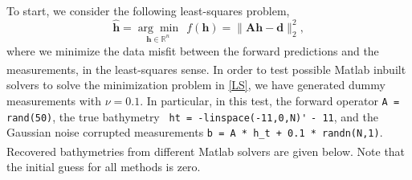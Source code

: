 To start,  we consider the following least-squares problem,
\begin{equation}\label{LS}
\mathbf{\hat{h}}= \underset{\mathbf{h} \in \mathbb{R}^n}{\arg \min} \ \ f(\mathbf{h}) = \|  \mathbf{A}\mathbf{h} -  \mathbf{d} \|_2^2,
\end{equation}
where we minimize the data misfit between the forward predictions and the measurements, in the least-squares sense. In order to test possible Matlab\textsuperscript{\textregistered} inbuilt solvers to solve the minimization problem in  \eqref{LS}, we have generated dummy measurements with $\nu = 0.1$. In particular, in this test, the forward operator \verb|A = rand(50)|, the true bathymetry \verb| ht = -linspace(-11,0,N)'| \verb|- 11|, and the Gaussian noise corrupted measurements \verb|b = A * h_t + 0.1 * randn(N,1)|. Recovered bathymetries from different Matlab\textsuperscript{\textregistered} solvers are given below. Note that the initial guess for all methods is zero. 

